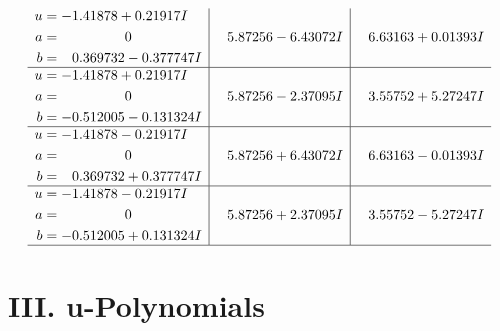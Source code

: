 \documentclass[1p]{elsarticle_modified}
\theoremstyle{definition}
\begin{document}
$$\begin{array}{c|c|c}
\begin{aligned}
u &= -1.41878 + 0.21917 I \\
a &= \phantom{-0.000000 } 0 \\
b &= \phantom{-}0.369732 - 0.377747 I\end{aligned}
 & \phantom{-}5.87256 - 6.43072 I & \phantom{-}6.63163 + 0.01393 I \\ \hline\begin{aligned}
u &= -1.41878 + 0.21917 I \\
a &= \phantom{-0.000000 } 0 \\
b &= -0.512005 - 0.131324 I\end{aligned}
 & \phantom{-}5.87256 - 2.37095 I & \phantom{-}3.55752 + 5.27247 I \\ \hline\begin{aligned}
u &= -1.41878 - 0.21917 I \\
a &= \phantom{-0.000000 } 0 \\
b &= \phantom{-}0.369732 + 0.377747 I\end{aligned}
 & \phantom{-}5.87256 + 6.43072 I & \phantom{-}6.63163 - 0.01393 I \\ \hline\begin{aligned}
u &= -1.41878 - 0.21917 I \\
a &= \phantom{-0.000000 } 0 \\
b &= -0.512005 + 0.131324 I\end{aligned}
 & \phantom{-}5.87256 + 2.37095 I & \phantom{-}3.55752 - 5.27247 I\\
 \hline 
 \end{array}$$\newpage
\newpage\renewcommand{\arraystretch}{1}
\centering \section*{ III. u-Polynomials}
\end{document}
